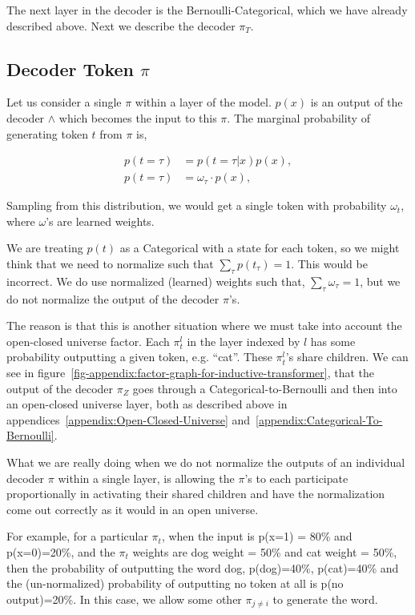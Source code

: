\documentclass{article}
\begin{document}
The next layer in the decoder is the Bernoulli-Categorical, which we have already described above.  Next we describe the decoder $\pi_T$.

\subsection{Decoder Token $\pi$}

Let us consider a single $\pi$ within a layer of the model. $p(x)$ is an output of the decoder $\land$ which becomes the input to this $\pi$. The marginal probability of generating token $t$ from $\pi$ is,

\begin{align}
    p(t=\tau) &= p(t=\tau|x) p(x), \nonumber \\
    p(t=\tau) &= \omega_\tau \cdot p(x),
\end{align}

Sampling from this distribution, we would get a single token with probability $\omega_{t}$, where $\omega$'s are learned weights.

We are treating $p(t)$ as a Categorical with a state for each token, so we might think that we need to normalize such that $\sum_{\tau} p(t_\tau) = 1$.  This would be incorrect.
We do use normalized (learned) weights such that, $\sum_\tau \omega_{\tau} = 1$, but we do not normalize the output of the decoder $\pi$'s.

The reason is that this is another situation where we must take into account the open-closed universe factor.  Each $\pi^l_t$ in the layer indexed by $l$ has some probability outputting a given token, e.g. ``cat''.  These $\pi^l_t$'s share children.  We can see in figure~\ref{fig-appendix:factor-graph-for-inductive-transformer}, that the output of the decoder $\pi_Z$ goes through a Categorical-to-Bernoulli and then into an open-closed universe layer, both as described above in appendices~\ref{appendix:Open-Closed-Universe} and~\ref{appendix:Categorical-To-Bernoulli}.

What we are really doing when we do not normalize the outputs of an individual decoder $\pi$ within a single layer, is allowing the $\pi$'s to each participate proportionally in activating their shared children and have the normalization come out correctly as it would in an open universe.

For example, for a particular $\pi_t$, when the input is p(x=1) = 80\% and p(x=0)=20\%, and the $\pi_t$ weights are dog weight = 50\% and cat weight = 50\%, then the probability of outputting the word dog, p(dog)=40\%, p(cat)=40\% and the (un-normalized) probability of outputting no token at all is p(no output)=20\%.  In this case, we allow some other $\pi_{j \neq i}$ to generate the word.
\end{document}
